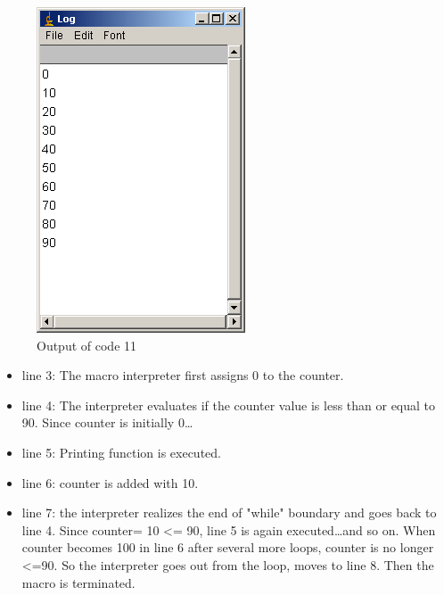 \documentclass[11pt,a4paper,oneside]{report}
\begin{document}
\begin{figure}[htbp]
\begin{center}
\includegraphics[scale=0.4]{fig/fig2331_Code11out.png}
\caption{Output of code 11}
\label{fig:code11 output}
\end{center}
\end{figure} 

\begin{itemize}
\item line 3: The macro interpreter first assigns 0 to the counter.
\item line 4: The interpreter evaluates if the counter value is less than or equal to 90. Since counter is initially 0\ldots 
\item line 5: Printing function is executed. 
\item line 6: counter is added with 10. 
\item line 7: the interpreter realizes the end of "while" boundary and goes back to line 4. Since counter= 10 <= 90, line 5 is again executed\ldots and so on. When counter becomes 100 in line 6 after several more loops, counter is no longer <=90. So the interpreter goes out from the loop, moves to line 8. Then the macro is terminated.
\end{itemize}
\end{document}
